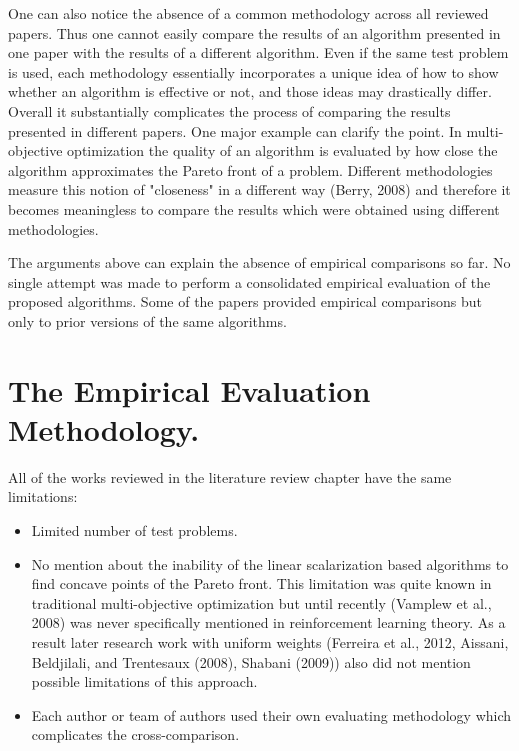 One can also notice the absence of a common methodology across all reviewed papers. Thus one cannot easily compare the results of an algorithm presented in one paper with the results of a different algorithm. Even if the same test problem is used, each methodology essentially incorporates a unique idea of how to show whether an algorithm is effective or not, and those ideas may drastically differ. Overall it substantially complicates the process of comparing the results presented in different papers. One major example can clarify the point. In multi-objective optimization the quality of an algorithm is evaluated by how close the algorithm approximates the Pareto front of a problem. Different methodologies measure this notion of "closeness" in a different way (Berry, 2008\nocite{berry2008phd}) and therefore it becomes meaningless to compare the results which were obtained using different methodologies.

The arguments above can explain the absence of empirical comparisons so far. No single attempt was made to perform a consolidated empirical evaluation of the proposed algorithms. Some of the papers provided empirical comparisons but only to prior versions of the same algorithms.

\section{The Empirical Evaluation Methodology.}

All of the works reviewed in the literature review chapter have the same limitations:
\begin{itemize}
  \item Limited number of test problems.
  \item No mention about the inability of the linear scalarization based algorithms to find concave points of the Pareto front. This limitation was quite known in traditional multi-objective optimization but until recently (Vamplew et al., 2008\nocite{vamplew2008limitations}) was never specifically mentioned in reinforcement learning theory. As a result later research work with uniform weights (Ferreira et al., 2012\nocite{F6363312}, Aissani, Beldjilali, and Trentesaux (2008)\nocite{aissani2008use}, Shabani (2009)\nocite{shabani2009incorporating}) also did not mention possible limitations of this approach.
  \item Each author or team of authors used their own evaluating methodology which complicates the cross-comparison.
\end{itemize}

